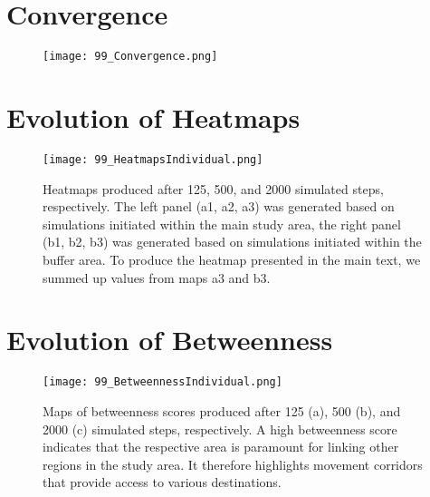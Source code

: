 \documentclass[abstract=off,10pt,a4paper,bibliography=totocnumbered]{article}
\begin{document}
\newpage
\section{Convergence}
\begin{figure}[hbtp]
  \begin{center}
    \texttt{[image: 99\_Convergence.png]}
    \caption{}
    \label{Trajectories}
  \end{center}
\end{figure}

\newpage
{}
\section{Evolution of Heatmaps}
\begin{figure}[hbtp]
  \begin{center}
    \texttt{[image: 99\_HeatmapsIndividual.png]}
    \caption{Heatmaps produced after 125, 500, and 2000 simulated steps,
    respectively. The left panel (a1, a2, a3) was generated based on simulations
    initiated within the main study area, the right panel (b1, b2, b3) was
    generated based on simulations initiated within the buffer area. To produce
    the heatmap presented in the main text, we summed up values from maps a3 and
    b3.}
    \label{Trajectories}
  \end{center}
\end{figure}
\restoregeometry

\newpage
{}
\section{Evolution of Betweenness}
\begin{figure}[hbtp]
  \begin{center}
    \texttt{[image: 99\_BetweennessIndividual.png]}
    \caption{Maps of betweenness scores produced after 125 (a), 500 (b), and
    2000 (c) simulated steps, respectively. A high betweenness score indicates
    that the respective area is paramount for linking other regions in the study
    area. It therefore highlights movement corridors that provide access to
    various destinations.}
    \label{Trajectories}
  \end{center}
\end{figure}
\restoregeometry
\end{document}
